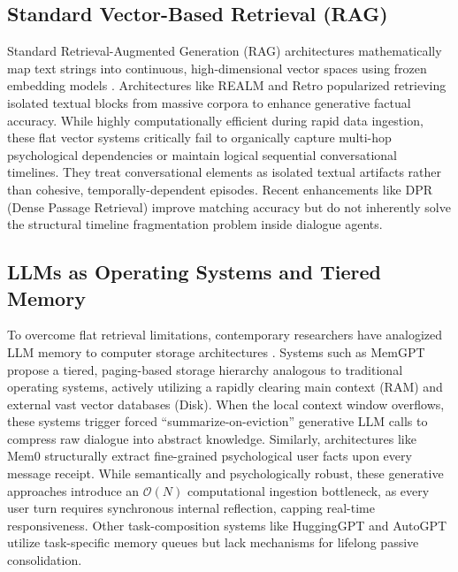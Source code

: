 \documentclass[conference]{IEEEtran}
\begin{document}
\subsection{Standard Vector-Based Retrieval (RAG)}
Standard Retrieval-Augmented Generation (RAG) architectures mathematically map text strings into continuous, high-dimensional vector spaces using frozen embedding models \cite{reimers2019sentence}. Architectures like REALM \cite{guu2020realm} and Retro \cite{borgeaud2022improving} popularized retrieving isolated textual blocks from massive corpora to enhance generative factual accuracy. While highly computationally efficient during rapid data ingestion, these flat vector systems critically fail to organically capture multi-hop psychological dependencies or maintain logical sequential conversational timelines. They treat conversational elements as isolated textual artifacts rather than cohesive, temporally-dependent episodes. Recent enhancements like DPR (Dense Passage Retrieval) \cite{karpukhin2020dense} improve matching accuracy but do not inherently solve the structural timeline fragmentation problem inside dialogue agents.

\subsection{LLMs as Operating Systems and Tiered Memory}
To overcome flat retrieval limitations, contemporary researchers have analogized LLM memory to computer storage architectures \cite{mei2024aios}. Systems such as MemGPT \cite{packer2023memgpt} propose a tiered, paging-based storage hierarchy analogous to traditional operating systems, actively utilizing a rapidly clearing main context (RAM) and external vast vector databases (Disk). When the local context window overflows, these systems trigger forced ``summarize-on-eviction'' generative LLM calls to compress raw dialogue into abstract knowledge. Similarly, architectures like Mem0 \cite{mem0} structurally extract fine-grained psychological user facts upon every message receipt. While semantically and psychologically robust, these generative approaches introduce an $\mathcal{O}(N)$ computational ingestion bottleneck, as every user turn requires synchronous internal reflection, capping real-time responsiveness. Other task-composition systems like HuggingGPT \cite{shen2023hugginggpt} and AutoGPT \cite{autogpt2023} utilize task-specific memory queues but lack mechanisms for lifelong passive consolidation.
\end{document}

